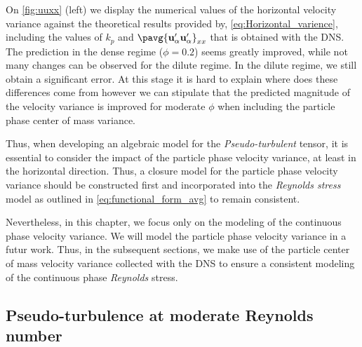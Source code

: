 On \ref{fig:uuxx} (left) we display the numerical values of the horizontal velocity variance against the theoretical results provided by, \ref{eq:Horizontal_varience}, including the values of $k_p$ and $\pavg{\textbf{u}_\alpha'\textbf{u}_\alpha'}_{xx}$ that is obtained with the DNS. 
The prediction in the dense regime ($\phi = 0.2$) seems greatly improved, while not many changes can be observed for the dilute regime. 
In the dilute regime, we still obtain a significant error. 
At this stage it is hard to explain where does these differences come from however we can stipulate that the predicted magnitude of the velocity variance is improved for moderate $\phi$ when including the particle phase center of mass variance. 

Thus, when developing an algebraic model for the \textit{Pseudo-turbulent} tensor, it is essential to consider the impact of the particle phase velocity variance, at least in the horizontal direction. 
Thus, a closure model for the particle phase velocity variance should be constructed first and incorporated into the \textit{Reynolds stress} model as outlined in \ref{eq:functional_form_avg} to remain consistent.

Nevertheless, in this chapter, we focus only on the modeling of the continuous phase velocity variance. 
We will model the particle phase velocity variance in a futur work. 
Thus, in the subsequent sections, we make use of the particle center of mass velocity variance collected with the DNS to ensure a consistent modeling of the continuous phase \textit{Reynolds} stress.    


\subsection{Pseudo-turbulence at moderate Reynolds number}

